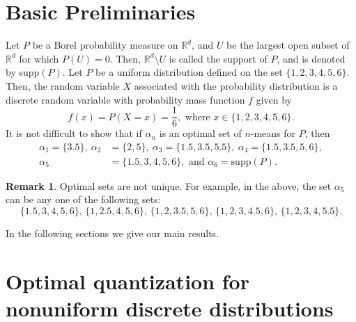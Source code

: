 \documentclass[12pt, reqno]{amsart}
\theoremstyle{plain}
\theoremstyle{definition}
\newtheorem{remark}[subsection]{Remark}
\newcommand{\set}[1]{\{#1\}}%
\newcommand{\ga}{\alpha}
\newcommand{\D}[1]{\mathbb{#1}}%
\newcommand{\te}{\text}%
\begin{document}
\section{Basic Preliminaries} \label{sec0} 
Let $P$ be a Borel probability measure on $\D R^d$, and $U$ be the largest open subset of $\D R^d$ for which $P(U)=0$. Then, $\D R^d \setminus U$ is called the support of $P$, and is denoted by supp$(P)$. Let $P$ be a uniform distribution defined on the set $\set{1, 2, 3, 4, 5, 6}$. Then, the random variable $X$ associated with the probability distribution is a discrete random variable with probability mass function $f$ given by
 \[f(x)=P(X=x)=\frac 16, \te{ where } x\in \set{1, 2, 3, 4, 5, 6}.\]
It is not difficult to show that if $\ga_n$ is an optimal set of $n$-means for $P$, then
\begin{align*}
\ga_1=\set{3.5}, \  \ga_2& =\set{2, 5}, \ \ga_3=\set{1.5, 3.5, 5.5}, \  \ga_4=\set{1.5, 3.5, 5, 6}, \\
 \ga_5&=\set{1.5, 3, 4, 5, 6}, \te{ and } \ga_6=\te{supp}(P).
\end{align*}
\begin{remark}
Optimal sets are not unique. For example, in the above, the set $\ga_5$ can be any one of the following sets:
\[\set{1.5, 3, 4, 5, 6}, \, \set{1, 2.5, 4, 5, 6}, \, \set{1, 2, 3.5, 5, 6}, \, \set{1, 2, 3, 4.5, 6}, \, \set{1, 2, 3, 4, 5.5}.\]
\end{remark}
In the following sections we give our main results.


\section{Optimal quantization for nonuniform discrete distributions} \label{sec1}
\end{document}
